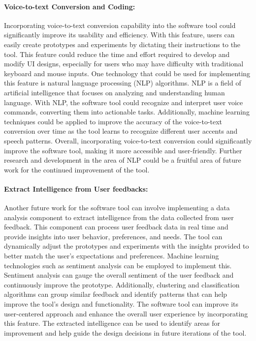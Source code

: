 \paragraph{Voice-to-text Conversion and Coding:}
Incorporating voice-to-text conversion capability into the software tool could significantly improve its usability and efficiency. 
With this feature, users can easily create prototypes and experiments by dictating their instructions to the tool. 
This feature could reduce the time and effort required to develop and modify UI designs, especially for users who may have difficulty with traditional keyboard and mouse inputs.
One technology that could be used for implementing this feature is natural language processing (NLP) algorithms. 
NLP is a field of artificial intelligence that focuses on analyzing and understanding human language. 
With NLP, the software tool could recognize and interpret user voice commands, converting them into actionable tasks. 
Additionally, machine learning techniques could be applied to improve the accuracy of the voice-to-text conversion over time as the tool learns to recognize different user accents and speech patterns.
Overall, incorporating voice-to-text conversion could significantly improve the software tool, making it more accessible and user-friendly. 
Further research and development in the area of NLP could be a fruitful area of future work for the continued improvement of the tool.

\paragraph{Extract Intelligence from User feedbacks:}
Another future work for the software tool can involve implementing a data analysis component to extract intelligence from the data collected from user feedback. 
This component can process user feedback data in real time and provide insights into user behavior, preferences, and needs. 
The tool can dynamically adjust the prototypes and experiments with the insights provided to better match the user's expectations and preferences.
Machine learning technologies such as sentiment analysis can be employed to implement this. 
Sentiment analysis can gauge the overall sentiment of the user feedback and continuously improve the prototype. 
Additionally, clustering and classification algorithms can group similar feedback and identify patterns that can help improve the tool's design and functionality.
The software tool can improve its user-centered approach and enhance the overall user experience by incorporating this feature. 
The extracted intelligence can be used to identify areas for improvement and help guide the design decisions in future iterations of the tool.

